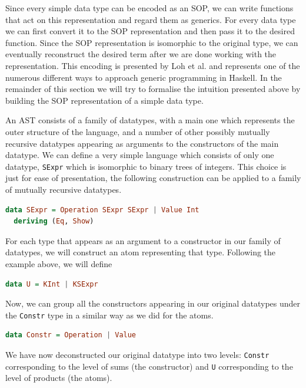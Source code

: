 \documentclass[11pt]{article}
\begin{document}
Since every simple data type can be encoded as an SOP, we can write functions 
that act on this representation and regard them as generics. For every data type 
we can first convert it to the SOP representation and then pass it to 
the desired function. Since the SOP representation is isomorphic to the original type, we can eventually reconstruct the 
desired term after we are done working with the representation. This encoding is 
presented by Loh et al. \cite{true-sop} and represents one of the numerous different ways to 
approach generic programming in Haskell. 
In the remainder of this section we will try to formalise the intuition presented 
above by building the SOP representation of a simple data type. 

\vfill

An AST consists of a family of datatypes, with a main one which
represents the outer structure of the language, and a number of other
possibly mutually recursive datatypes appearing as arguments to the
constructors of the main datatype. We can define a very simple language which 
consists of only one datatype, \texttt{SExpr} which is isomorphic to binary trees 
of integers. This choice is just for ease of presentation, the following construction 
can be applied to a family of mutually recursive datatypes.

\begin{lstlisting}[language=haskell]
data SExpr = Operation SExpr SExpr | Value Int
  deriving (Eq, Show)
\end{lstlisting}

For each type that appears as an argument to a constructor in our family
of datatypes, we will construct an atom representing that type.
Following the example above, we will define

\begin{lstlisting}[language=haskell]
data U = KInt | KSExpr 
\end{lstlisting}

Now, we can group all the constructors appearing in our original
datatypes under the \texttt{Constr} type in a similar way as we
did for the atoms. 

\begin{lstlisting}[language=haskell]
data Constr = Operation | Value
\end{lstlisting}

We have now deconstructed our original datatype into two levels: \texttt{Constr} corresponding to the level of sums (the constructor) 
and  \texttt{U} corresponding to the level of products (the atoms).
\end{document}
